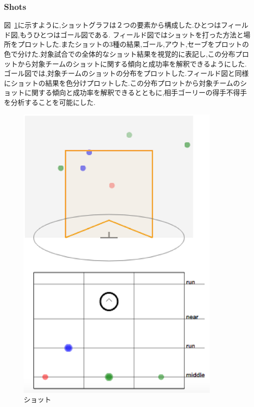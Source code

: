 \documentclass[sotsuron]{kuee}
\begin{document}
			\subsubsection{Shots}
				図~\ref{fig:shots}に示すように,ショットグラフは２つの要素から構成した.ひとつはフィールド図,もうひとつはゴール図である.
				フィールド図ではショットを打った方法と場所をプロットした.またショットの3種の結果,ゴール,アウト,セーブをプロットの色で分けた.対象試合での全体的なショット結果を視覚的に表記し,この分布プロットから対象チームのショットに関する傾向と成功率を解釈できるようにした.
				ゴール図では,対象チームのショットの分布をプロットした.フィールド図と同様にショットの結果を色分けプロットした.この分布プロットから対象チームのショットに関する傾向と成功率を解釈できるとともに,相手ゴーリーの得手不得手を分析することを可能にした.
					\begin{figure}
						\begin{center}
							\includegraphics[width=10cm]{shots.eps}
						\end{center}
						\caption{ショット}
				  		\label{fig:shots}
					\end{figure}
\end{document}
